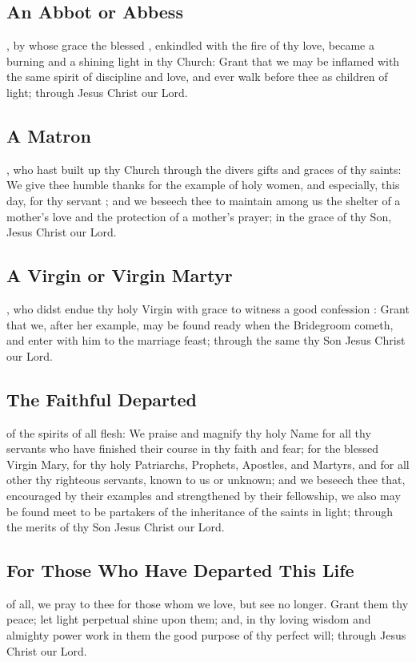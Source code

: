 \subsection{An Abbot or Abbess}
, by whose grace the blessed , enkindled with the fire of thy love, became a burning and a shining light in thy Church: Grant that we may be inflamed with the same spirit of discipline and love, and ever walk before thee as children of light; through Jesus Christ our Lord.

\subsection{A Matron}
, who hast built up thy Church through the divers gifts and graces of thy saints: We give thee humble thanks for the example of holy women, and especially, this day, for thy servant ; and we beseech thee to maintain among us the shelter of a mother's love and the protection of a mother's prayer; in the grace of thy Son, Jesus Christ our Lord.

\subsection{A Virgin or Virgin Martyr}
, who didst endue thy holy Virgin  with grace to witness a good confession : Grant that we, after her example, may be found ready when the Bridegroom cometh, and enter with him to the marriage feast; through the same thy Son Jesus Christ our Lord.

\subsection{The Faithful Departed}
 of the spirits of all flesh: We praise and magnify thy holy Name for all thy servants who have finished their course in thy faith and fear; for the blessed Virgin Mary, for thy holy Patriarchs, Prophets, Apostles, and Martyrs, and for all other thy righteous servants, known to us or unknown; and we beseech thee that, encouraged by their examples and strengthened by their fellowship, we also may be found meet to be partakers of the inheritance of the saints in light; through the merits of thy Son Jesus Christ our Lord.

\subsection{For Those Who Have Departed This Life}
 of all, we pray to thee for those whom we love, but see no longer. Grant them thy peace; let light perpetual shine upon them; and, in thy loving wisdom and almighty power work in them the good purpose of thy perfect will; through Jesus Christ our Lord.

